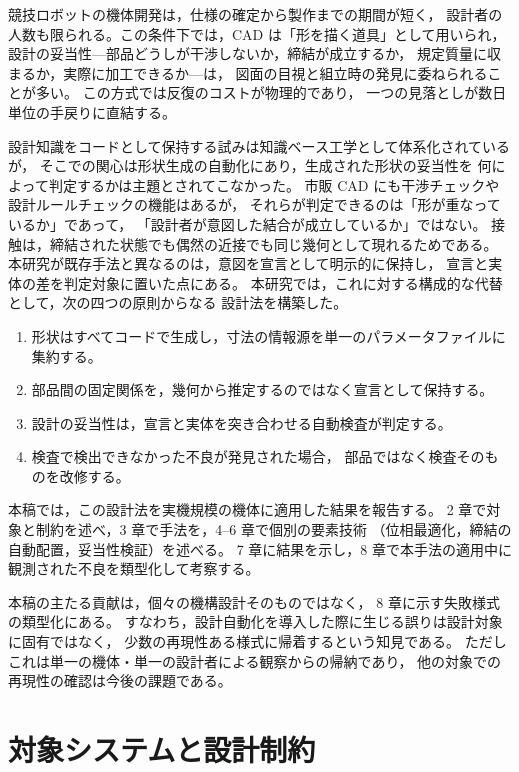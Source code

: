 \documentclass[a4paper,10pt,twocolumn]{ltjsarticle}
\begin{document}
競技ロボットの機体開発は，仕様の確定から製作までの期間が短く，
設計者の人数も限られる。この条件下では，CAD は「形を描く道具」として用いられ，
設計の妥当性---部品どうしが干渉しないか，締結が成立するか，
規定質量に収まるか，実際に加工できるか---は，
図面の目視と組立時の発見に委ねられることが多い。
この方式では反復のコストが物理的であり，
一つの見落としが数日単位の手戻りに直結する。

設計知識をコードとして保持する試みは知識ベース工学として体系化されているが\cite{larocca2012}，
そこでの関心は形状生成の自動化にあり，生成された形状の妥当性を
何によって判定するかは主題とされてこなかった。
市販 CAD にも干渉チェックや設計ルールチェックの機能はあるが，
それらが判定できるのは「形が重なっているか」であって，
「設計者が意図した結合が成立しているか」ではない。
接触は，締結された状態でも偶然の近接でも同じ幾何として現れるためである。
本研究が既存手法と異なるのは，意図を宣言として明示的に保持し，
宣言と実体の差を判定対象に置いた点にある。
本研究では，これに対する構成的な代替として，次の四つの原則からなる
設計法を構築した。

\begin{enumerate}[label=(\roman*)]
\item 形状はすべてコードで生成し，寸法の情報源を単一のパラメータファイルに集約する。
\item 部品間の固定関係を，幾何から推定するのではなく宣言として保持する。
\item 設計の妥当性は，宣言と実体を突き合わせる自動検査が判定する。
\item 検査で検出できなかった不良が発見された場合，
      部品ではなく検査そのものを改修する。
\end{enumerate}

本稿では，この設計法を実機規模の機体に適用した結果を報告する。
2 章で対象と制約を述べ，3 章で手法を，4--6 章で個別の要素技術
（位相最適化，締結の自動配置，妥当性検証）を述べる。
7 章に結果を示し，8 章で本手法の適用中に観測された不良を類型化して考察する。

本稿の主たる貢献は，個々の機構設計そのものではなく，
8 章に示す失敗様式の類型化にある。
すなわち，設計自動化を導入した際に生じる誤りは設計対象に固有ではなく，
少数の再現性ある様式に帰着するという知見である。
ただしこれは単一の機体・単一の設計者による観察からの帰納であり，
他の対象での再現性の確認は今後の課題である。

\section{対象システムと設計制約}
\end{document}
